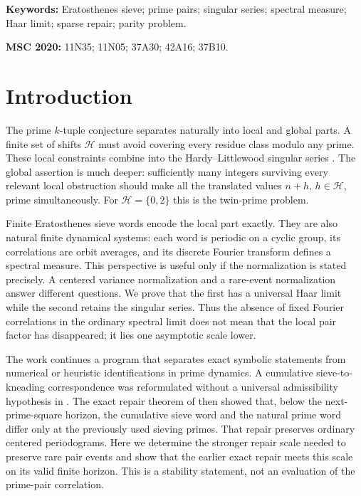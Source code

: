 \documentclass[11pt]{article}
\theoremstyle{definition}
\theoremstyle{remark}
\newcommand{\cH}{\mathcal H}
\begin{document}
\noindent\textbf{Keywords:} Eratosthenes sieve; prime pairs; singular series; spectral measure; Haar limit; sparse repair; parity problem.

\medskip
\noindent\textbf{MSC 2020:} 11N35; 11N05; 37A30; 42A16; 37B10.

\section{Introduction}

The prime $k$-tuple conjecture separates naturally into local and global parts.  A finite set of shifts $\cH$ must avoid covering every residue class modulo any prime.  These local constraints combine into the Hardy--Littlewood singular series \citep{HardyLittlewood1923}.  The global assertion is much deeper: sufficiently many integers surviving every relevant local obstruction should make all the translated values $n+h$, $h\in\cH$, prime simultaneously.  For $\cH=\{0,2\}$ this is the twin-prime problem.

Finite Eratosthenes sieve words encode the local part exactly.  They are also natural finite dynamical systems: each word is periodic on a cyclic group, its correlations are orbit averages, and its discrete Fourier transform defines a spectral measure.  This perspective is useful only if the normalization is stated precisely.  A centered variance normalization and a rare-event normalization answer different questions.  We prove that the first has a universal Haar limit while the second retains the singular series.  Thus the absence of fixed Fourier correlations in the ordinary spectral limit does not mean that the local pair factor has disappeared; it lies one asymptotic scale lower.

The work continues a program that separates exact symbolic statements from numerical or heuristic identifications in prime dynamics.  A cumulative sieve-to-kneading correspondence was reformulated without a universal admissibility hypothesis in \citet{WangReformulation2026}.  The exact repair theorem of \citet{WangPrimeSpectrum2026} then showed that, below the next-prime-square horizon, the cumulative sieve word and the natural prime word differ only at the previously used sieving primes.  That repair preserves ordinary centered periodograms.  Here we determine the stronger repair scale needed to preserve rare pair events and show that the earlier exact repair meets this scale on its valid finite horizon.  This is a stability statement, not an evaluation of the prime-pair correlation.
\end{document}
